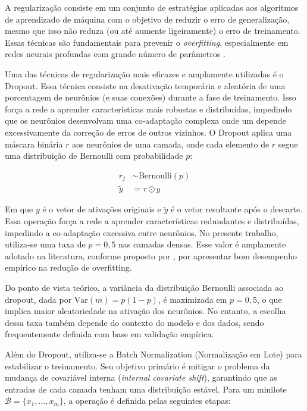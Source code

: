 A regularização consiste em um conjunto de estratégias aplicadas aos algoritmos de aprendizado de máquina com o objetivo de reduzir o erro de 
generalização, mesmo que isso não reduza (ou até aumente ligeiramente) o erro de treinamento. Essas técnicas são fundamentais para prevenir o 
\textit{overfitting}, especialmente em redes neurais profundas com grande número de parâmetros .

Uma das técnicas de regularização mais eficazes e amplamente utilizadas é o Dropout. Essa técnica consiste na desativação temporária e aleatória de 
uma porcentagem de neurônios (e suas conexões) durante a fase de treinamento. Isso força a rede a aprender características mais robustas e distribuídas, 
impedindo que os neurônios desenvolvam uma co-adaptação complexa onde um depende excessivamente da correção de erros de outros vizinhos. O Dropout aplica 
uma máscara binária $r$ aos neurônios de uma camada, onde cada elemento de $r$ segue uma distribuição de Bernoulli com probabilidade $p$:

\begin{align}
    \label{eq: eq4}
    r_j &\sim \text{Bernoulli}(p) \\
    \tilde{y} &= r \odot y \nonumber
\end{align}

Em que $y$ é o vetor de ativações originais e $\tilde{y}$ é o vetor resultante após o descarte. Essa operação força a rede a aprender características 
redundantes e distribuídas, impedindo a co-adaptação excessiva entre neurônios. No presente trabalho, utiliza-se uma taxa de $p = 0,5$ nas 
camadas densas. Esse valor é amplamente adotado na literatura, conforme proposto por , por apresentar bom desempenho empírico na 
redução de overfitting.

Do ponto de vista teórico, a variância da distribuição Bernoulli associada ao dropout, dada por $\mathrm{Var}(m) = p(1 - p)$, é maximizada 
em $p = 0{,}5$, o que implica maior aleatoriedade na ativação dos neurônios. No entanto, a escolha dessa taxa também depende do contexto do modelo e 
dos dados, sendo frequentemente definida com base em validação empírica.

Além do Dropout, utiliza-se a Batch Normalization (Normalização em Lote) para estabilizar o treinamento. Seu objetivo primário é mitigar o 
problema da mudança de covariável interna (\textit{internal covariate shift}), garantindo que as entradas de cada camada tenham uma distribuição estável. 
Para um minilote $\mathcal{B} = \{x_1, ..., x_m\}$, a operação é definida pelas seguintes etapas:

